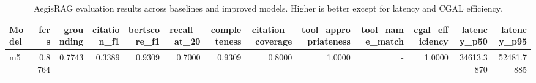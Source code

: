\begin{table}[t]
\centering
\small
\caption{AegisRAG evaluation results across baselines and improved models. Higher is better except for latency and CGAL efficiency.}
\label{tab:aegis-results}
\begin{tabular}{lrrrrrrrrrrrr}
\toprule
Model & fcrs & grounding & citation\_f1 & bertscore\_f1 & recall\_at\_20 & completeness & citation\_coverage & tool\_appropriateness & tool\_name\_match & cgal\_efficiency & latency\_p50 & latency\_p95 \\
\midrule
m5 & 0.8764 & 0.7743 & 0.3389 & 0.9309 & 0.7000 & 0.9309 & 0.8000 & 1.0000 & - & 1.0000 & 34613.3870 & 52481.7885 \\
\bottomrule
\end{tabular}
\end{table}